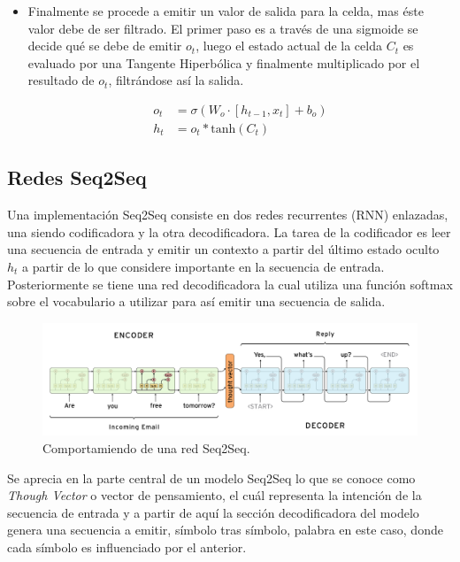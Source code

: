 \documentclass[12pt, letterpaper]{article}
\begin{document}
\begin{itemize}
            \item Finalmente se procede a emitir un valor de salida para la celda, mas éste valor debe de ser filtrado. El primer paso es a través de una sigmoide se decide qué se debe de emitir $o_t$, luego el estado actual de la celda $C_t$ es evaluado por una Tangente Hiperbólica y finalmente multiplicado por el resultado de $o_t$, filtrándose así la salida\cite{Understanding_LSTM}.

            \begin{equation}
                \begin{aligned}
                    o_t &= \sigma(W_o\cdot{[h_{t-1}, x_t]} + b_o) \\
                    h_t &=  o_t*\text{tanh}(C_t)
                \end{aligned}
            \end{equation}
        \end{itemize}

    \subsection{Redes Seq2Seq}
    Una implementación Seq2Seq consiste en dos redes recurrentes (RNN) enlazadas, una siendo codificadora y la otra decodificadora. La tarea de la codificador es leer una secuencia de entrada y emitir un contexto a partir del último estado oculto $h_t$ a partir de lo que considere importante en la secuencia de entrada. Posteriormente se tiene una red decodificadora la cual utiliza una función softmax sobre el vocabulario a utilizar para así emitir una secuencia de salida\cite{Ramamoorthy}\cite{Ramamoorthy2}.

    \begin{figure}[H]
        \centering
        \includegraphics[width=\linewidth]{img/Seq2Seq.png}
        \caption{Comportamiendo de una red Seq2Seq.}
    \end{figure}

    Se aprecia en la parte central de un modelo Seq2Seq lo que se conoce como \emph{Though Vector} o vector de pensamiento, el cuál representa la intención de la secuencia de entrada y a partir de aquí la sección decodificadora del modelo genera una secuencia a emitir, símbolo tras símbolo, palabra en este caso, donde cada símbolo es influenciado por el anterior.
\end{document}
